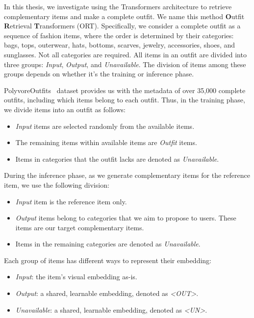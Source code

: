 In this thesis, we investigate using the Transformers architecture to retrieve complementary items and make a complete outfit. We name this method \textbf{O}utfit \textbf{R}etrieval \textbf{T}ransformers (ORT). Specifically, we consider a complete outfit as a sequence of fashion items, where the order is determined by their categories: bags, tops, outerwear, hats, bottoms, scarves, jewelry, accessories, shoes, and sunglasses. Not all categories are required. All items in an outfit are divided into three groups: \textit{Input}, \textit{Output}, and \textit{Unavailable}. The division of items among these groups depends on whether it's the training or inference phase.

PolyvoreOutfits~\cite{Mariya-ECCV18-Learning} dataset provides us with the metadata of over 35,000 complete outfits, including which items belong to each outfit. Thus, in the training phase, we divide items into an outfit as follows:
\begin{itemize}
    \item \textit{Input} items are selected randomly from the available items.
    \item The remaining items within available items are \textit{Outfit} items.
    \item Items in categories that the outfit lacks are denoted as \textit{Unavailable}.
\end{itemize}

During the inference phase, as we generate complementary items for the reference item, we use the following division:
\begin{itemize}
    \item \textit{Input} item is the reference item only.
    \item \textit{Output} items belong to categories that we aim to propose to users. These items are our target complementary items.
    \item Items in the remaining categories are denoted as \textit{Unavailable}.
\end{itemize}

Each group of items has different ways to represent their embedding:
\begin{itemize}
    \item \textit{Input}: the item's visual embedding as-is.
    \item \textit{Output}: a shared, learnable embedding, denoted as \textit{<OUT>}.
    \item \textit{Unavailable}: a shared, learnable embedding, denoted as \textit{<UN>}.
\end{itemize}

